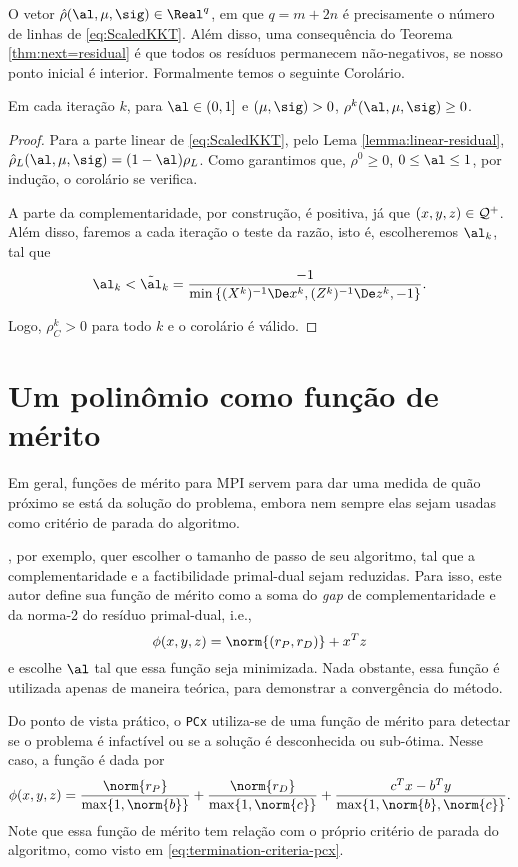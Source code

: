 O vetor  $\hat{\rho}(\al,\mu,\sig) \in \Real^q$, em que  $q = m+2n$ é
precisamente o número de linhas de  \eqref{eq:ScaledKKT}. Além disso, uma
consequência do Teorema \ref{thm:next=residual} é que todos os resíduos
permanecem não-negativos, se nosso ponto inicial é interior. Formalmente temos o seguinte Corolário. 

\begin{corol}\label{cor:positive-residual}
Em cada iteração $k$, para  $ \al \in(0,1]$ e  $(\mu, \sig)>0$,
$\rho^k(\al,\mu,\sig) \geq 0$.
\end{corol} 
\begin{proof}

Para a parte linear de  \eqref{eq:ScaledKKT}, pelo Lema
\ref{lemma:linear-residual}, $\hat{\rho}_L(\al,\mu,\sig) = (1-\al)\rho_L$. Como
garantimos que, $\rho^0\geq 0$, $0\leq\al\leq1 $, por  indução, o corolário
se verifica.

A parte da complementaridade, por construção,  é positiva, já que 
$(x,y,z)\in\mathcal{Q}^+$. Além disso, faremos a cada iteração o teste da razão, isto é, escolheremos $\al_k$,
tal que 
\begin{equation}
	\label{eq:ratio-test}
\al_k < \tilde{\al}_k = \frac{-1}{\min\left\{
(X^k)^{-1}\Dex^k,(Z^k)^{-1}\Dez^k,-1 \right\}}. 
\end{equation}

Logo, $\rho^k_C>0$ para todo $k$ e o corolário é válido. 
\end{proof}

\section{Um polinômio como  função de mérito}


Em geral, funções de mérito para \ac{MPI} servem para dar uma medida de quão
próximo se está da solução do problema, embora nem sempre elas sejam usadas como
critério de parada do algoritmo. 

\textcite{Zhang:2006ic}, por exemplo, quer escolher o tamanho de passo de seu
algoritmo, tal que a  complementaridade e a factibilidade primal-dual sejam
reduzidas. Para isso, este autor define sua função de mérito como a soma do
\emph{gap} de complementaridade e da norma-2 do resíduo primal-dual, i.e., \[\phi(x,y,z) =
\norm{(r_P,r_D)} + x^Tz\] e escolhe $\al$ tal que essa função seja minimizada.
Nada obstante, essa função é utilizada apenas de maneira teórica, para
demonstrar a convergência do método.

Do ponto de vista prático, o  \texttt{PCx} \cite{Czyzyk:1999hk} utiliza-se de
uma função de mérito para detectar se o problema é infactível ou se a solução é desconhecida
ou sub-ótima. Nesse caso, a função é dada por 
\[
\phi(x,y,z) = \frac{\norm{r_P}}{\max \{1,\norm{b} \} } + \frac{\norm{r_D}}{\max
\{1,\norm{c} \} } + \frac{c^Tx - b^Ty}{\max \{1,\norm{b},\norm{c} \} }.
\]
Note que essa função de mérito tem relação com o próprio critério de parada
do algoritmo, como visto em  \eqref{eq:termination-criteria-pcx}.



